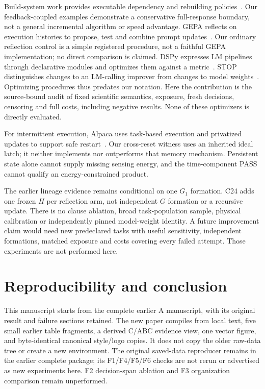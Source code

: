 Build-system work provides executable dependency and rebuilding
policies~\cite{mokhov2018}. Our feedback-coupled examples demonstrate a
conservative full-response boundary, not a general incremental algorithm or
speed advantage. GEPA reflects on execution histories to propose, test and
combine prompt updates~\cite{agrawal2026}. Our ordinary reflection control is a
simple registered procedure, not a faithful GEPA implementation; no direct
comparison is claimed. DSPy expresses LM pipelines through declarative modules
and optimizes them against a metric~\cite{khattab2023}. STOP distinguishes
changes to an LM-calling improver from changes to model weights~\cite{zelikman2024}.
Optimizing procedures thus predates our notation. Here the contribution is the
source-bound audit of fixed scientific semantics, exposure, fresh decisions,
censoring and full costs, including negative results. None of these optimizers
is directly evaluated.

For intermittent execution, Alpaca uses task-based execution and privatized
updates to support safe restart~\cite{maeng2017}. Our cross-reset witness uses
an inherited ideal latch; it neither implements nor outperforms that memory
mechanism. Persistent state alone cannot supply missing sensing energy, and
the time-component PASS cannot qualify an energy-constrained product.

The earlier lineage evidence remains conditional on one $G_1$ formation. C24
adds one frozen $H$ per reflection arm, not independent $G$ formation or a
recursive update. There is no clause ablation, broad task-population sample,
physical calibration or independently pinned model-weight identity. A future
improvement claim would need new predeclared tasks with useful sensitivity,
independent formations, matched exposure and costs covering every failed attempt.
Those experiments are not performed here.

\section{Reproducibility and conclusion}
This manuscript starts from the complete earlier A manuscript, with its
original result and failure sections retained. The new paper compiles from
local text, five small earlier table fragments, a derived C/ABC evidence view,
one vector figure, and byte-identical canonical style/logo copies. It does
not copy the older raw-data tree or create a new environment. The original
saved-data reproducer remains in the earlier complete package; its F1/F4/F5/F6
checks are not rerun or advertised as new experiments here. F2 decision-span
ablation and F3 organization comparison remain unperformed.

